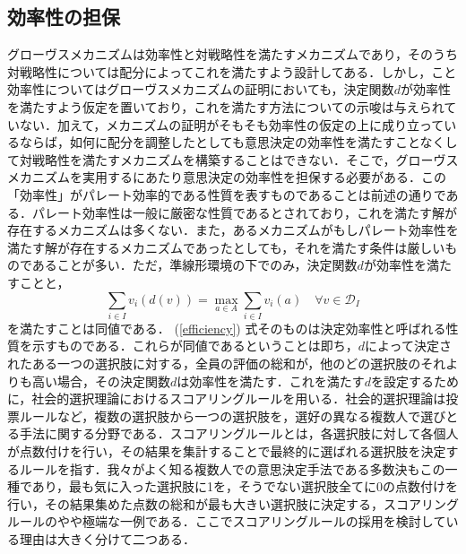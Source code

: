 \documentclass[a4paper, 11pt]{jsarticle}
\begin{document}
\subsection{効率性の担保}
グローヴスメカニズムは効率性と対戦略性を満たすメカニズムであり，そのうち対戦略性については配分によってこれを満たすよう設計してある．しかし，こと効率性についてはグローヴスメカニズムの証明においても，決定関数\(d\)が効率性を満たすよう仮定を置いており，これを満たす方法についての示唆は与えられていない．加えて，メカニズムの証明がそもそも効率性の仮定の上に成り立っているならば，如何に配分を調整したとしても意思決定の効率性を満たすことなくして対戦略性を満たすメカニズムを構築することはできない．そこで，グローヴスメカニズムを実用するにあたり意思決定の効率性を担保する必要がある．この「効率性」がパレート効率的である性質を表すものであることは前述の通りである．パレート効率性は一般に厳密な性質であるとされており，これを満たす解が存在するメカニズムは多くない．また，あるメカニズムがもしパレート効率性を満たす解が存在するメカニズムであったとしても，それを満たす条件は厳しいものであることが多い．ただ，準線形環境の下でのみ，決定関数\(d\)が効率性を満たすことと，
\begin{equation}
\label{efficiency}
\sum_{i \in I}v_i(d(v)) = \max_{a \in A}\sum_{i \in I}v_i(a) \quad \forall v \in \mathscr{D}_I
\end{equation}
を満たすことは同値である． (\ref{efficiency}) 式そのものは決定効率性と呼ばれる性質を示すものである．これらが同値であるということは即ち，\(d\)によって決定されたある一つの選択肢に対する，全員の評価の総和が，他のどの選択肢のそれよりも高い場合，その決定関数\(d\)は効率性を満たす．これを満たす\(d\)を設定するために，社会的選択理論におけるスコアリングルールを用いる．社会的選択理論は投票ルールなど，複数の選択肢から一つの選択肢を，選好の異なる複数人で選びとる手法に関する分野である．スコアリングルールとは，各選択肢に対して各個人が点数付けを行い，その結果を集計することで最終的に選ばれる選択肢を決定するルールを指す．我々がよく知る複数人での意思決定手法である多数決もこの一種であり，最も気に入った選択肢に1を，そうでない選択肢全てに0の点数付けを行い，その結果集めた点数の総和が最も大きい選択肢に決定する，スコアリングルールのやや極端な一例である．ここでスコアリングルールの採用を検討している理由は大きく分けて二つある．
\end{document}
